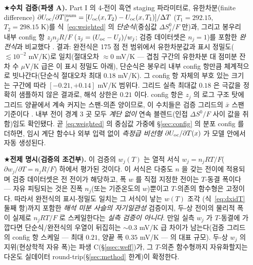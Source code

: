 \begin{srcbox}
★\textbf{수치 검증(파생 A).} Part I 의 4-전이 흑연 staging 파라미터로, 유한차분(finite difference)
$\partial U_{\mathrm{oc}}/\partial T|_x^\mathrm{num}=[U_{\mathrm{oc}}(x,T_2)-U_{\mathrm{oc}}(x,T_1)]/\Delta T$ ($T_1{=}292.15$, $T_2{=}298.15$ K)를
식~\eqref{eq:weighted} 의 \emph{단순식}(중심값 $\Delta S^0_j/F$ 만)과, 그리고 봉우리 내부 config 항 $z_j n_jR/F$
($z_j=(U_{\mathrm{oc}}-U_j)/w_j$; 검증 데이터셋은 $n_j{=}1$)를 포함한 \emph{완전식}과 비교했다 \cite{numverif2026}.
결과: 완전식은 175 점 전 범위에서 유한차분값과 표시 정밀도($\lesssim10^{-2}$ mV/K)로 일치(절대오차 $\approx0$
mV/K --- 겹침 구간의 유한차분 대 점미분 잔차 수 $\mu$V/K 급은 이 표시 정밀도 아래), 단순식은 봉우리 내부
config 항만큼 체계적으로 빗나간다(단순식 절대오차 최대 $0.18$ mV/K). 그 config 항 자체의 부호 있는 크기는
구간에 따라 $[-0.21,+0.14]$ mV/K 범위다. 그리드 실측 최대값 $0.18$ 은 극값을 정확히 샘플하지 않은 결과로,
해석 상한은 $0.21$ 이다. config 항은 $z_j$ 의 로그 구조 탓에 그리드 양끝에서 계속 커지는 스팬-의존 양이므로,
이 수치들은 검증 그리드의 $\bar x$ 스팬 기준이다 \cite{numverif2026}. 내부 전이 경계 3 곳 모두 \emph{계단 없이}
연속 블렌드(인접 $\Delta S^0/F$ 사이 값을 취함)임도 확인됐다. 곧 \eqref{eq:weighted} 의 중심값 가중에
\S\ref{sec:config} 의 분포 config 를 더하면, 임시 계단 함수나 외부 입력 없이 \emph{측정급 비선형}
$\partial U_{\mathrm{oc}}/\partial T(x)$ 가 모델 안에서 자동 생성된다.

★\textbf{전제 명시(검증의 조건부).} 이 검증의 $w_j(T)$ 는 열적 서식 $w_j=n_jRT/F$($\partial
w_j/\partial T=n_jR/F$) 하에서 평가된 것이다. 이 서식은 다중도 $n$ 을 갖는 전이에 적용되며 검증 데이터셋은 전
전이가 해당하고, 폭 $w$ 를 직접 지정한 전이는 $T$-동결 폭이다 --- 자유 피팅되는 것은 진폭 $n_j$(또는 기준온도의
$w$)뿐이고 $T$-의존의 함수형은 고정이다. 따라서 완전식의 표시-정밀도 일치는 그 서식이 낳는 $w(T)$ 조각
(식~\eqref{eq:dxidT} 둘째 항)까지 포함한 \emph{해석 미분 사슬의 자기일관성} 검증이지, 두-상 전이의 물리적 폭이
실제로 $n_jRT/F$ 로 스케일한다는 \emph{실측 검증이 아니다}. 만일 실측 $w_j$ 가 $T$-동결에 가깝다면 단순식/완전식의
우열이 뒤집히는 $\sim$0.3 mV/K 급 차이가 남는다(검증 그리드의 config 항 스케일 --- 최대 $0.21$, 양끝 폭 $0.35$
mV/K --- 의 대표 규모). 두-상 $w_j$ 의 지위(현상학적 자유 폭)는 파생 C(\S\ref{ssec:weff})가, 그 $T$-의존
함수형까지 자유화할지는 다온도 실데이터 round-trip(\S\ref{sec:method} 한계)이 확정한다.
\end{srcbox}

